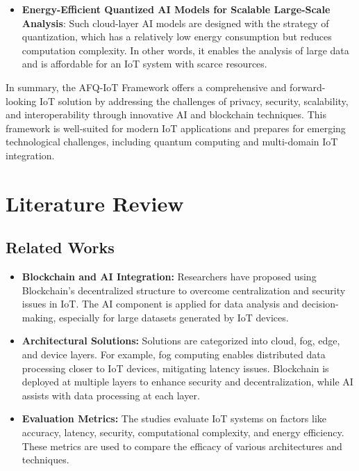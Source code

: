 \documentclass[12pt, oneside]{report}
\begin{document}
\begin{itemize}
    \item \textbf{Energy-Efficient Quantized AI Models for Scalable Large-Scale Analysis}: 
    Such cloud-layer AI models are designed with the strategy of quantization, which has a relatively low energy consumption but reduces computation complexity. In other words, it enables the analysis of large data and is affordable for an IoT system with scarce resources.

\end{itemize}

In summary, the AFQ-IoT Framework offers a comprehensive and forward-looking IoT solution by addressing the challenges of privacy, security, scalability, and interoperability through innovative AI and blockchain techniques. This framework is well-suited for modern IoT applications and prepares for emerging technological challenges, including quantum computing and multi-domain IoT integration.

\chapter{Literature Review}

\section{Related Works}
\begin{itemize}
\item \textbf{Blockchain and AI Integration:} Researchers have proposed using Blockchain’s decentralized structure to overcome centralization and security issues in IoT. The AI component is applied for data analysis and decision-making, especially for large datasets generated by IoT devices.

\item \textbf{Architectural Solutions:} Solutions are categorized into cloud, fog, edge, and device layers. For example, fog computing enables distributed data processing closer to IoT devices, mitigating latency issues. Blockchain is deployed at multiple layers to enhance security and decentralization, while AI assists with data processing at each layer.

\item \textbf{Evaluation Metrics:} The studies evaluate IoT systems on factors like accuracy, latency, security, computational complexity, and energy efficiency. These metrics are used to compare the efficacy of various architectures and techniques.

\end{itemize}
\end{document}

